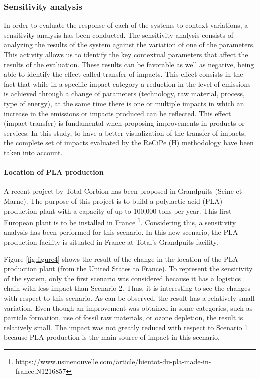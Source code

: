 \documentclass[12pt]{elsarticle} %
\begin{document}
\hypertarget{sensitivity-analysis}{%
\subsubsection{Sensitivity analysis}\label{sensitivity-analysis}}

In order to evaluate the response of each of the systems to context variations, a sensitivity analysis has been conducted.
The sensitivity analysis consists of analyzing the results of the system against the variation of one of the parameters.
This activity allows us to identify the key contextual parameters that affect the results of the evaluation.
These results can be favorable as well as negative, being able to identify the effect called transfer of impacts.
This effect consists in the fact that while in a specific impact category a reduction in the level of emissions is achieved through a change of parameters (technology, raw material, process, type of energy), at the same time there is one or multiple impacts in which an increase in the emissions or impacts produced can be reflected.
This effect (impact transfer) is fundamental when proposing improvements in products or services.
In this study, to have a better visualization of the transfer of impacts, the complete set of impacts evaluated by the ReCiPe (H) methodology have been taken into account.

\hypertarget{location-of-pla-production}{%
\paragraph{Location of PLA production}\label{location-of-pla-production}}

A recent project by Total Corbion has been proposed in Grandpuits (Seine-et-Marne).
The purpose of this project is to build a polylactic acid (PLA) production plant with a capacity of up to 100,000 tons per year.
This first European plant is to be installed in France \footnote{https://www.usinenouvelle.com/article/bientot-du-pla-made-in-france.N1216857}.
Considering this, a sensitivity analysis has been performed for this scenario.
In this new scenario, the PLA production facility is situated in France at Total's Grandpuits facility.

Figure \ref{fig:figure4} shows the result of the change in the location of the PLA production plant (from the United States to France).
To represent the sensitivity of the system, only the first scenario was considered because it has a logistics chain with less impact than Scenario 2.
Thus, it is interesting to see the changes with respect to this scenario.
As can be observed, the result has a relatively small variation.
Even though an improvement was obtained in some categories, such as particle formation, use of fossil raw materials, or ozone depletion, the result is relatively small.
The impact was not greatly reduced with respect to Scenario 1 because PLA production is the main source of impact in this scenario.
\end{document}
